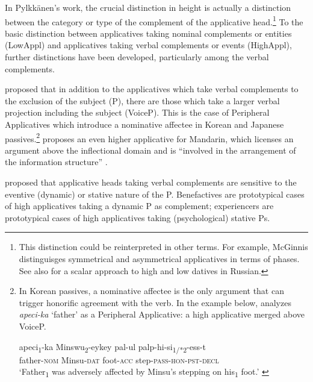 \documentclass[output=paper,colorlinks,citecolor=brown,modfonts,nonflat]{langsci/langscibook}
\begin{document}
In Pylkkänen’s work, the crucial distinction in height is actually a distinction between the category or type of the complement of the applicative head.\footnote{This distinction could be reinterpreted in other terms. For example, McGinnis distinguisges symmetrical and asymmetrical applicatives in terms of phases. See also \citet{BonehNash2017} for a scalar approach to high and low datives in Russian.} To the basic distinction between applicatives taking nominal complements or entities (LowAppl) and applicatives taking verbal complements or events (HighAppl), further distinctions have been developed, particularly among the verbal complements.

\citet{Kim2011high} proposed that in addition to the applicatives which take verbal complements to the exclusion of the subject ({\liv}P), there are those which take a larger verbal projection including the subject (VoiceP). This is the case of Peripheral Applicatives which introduce a nominative affectee in Korean and Japanese passives.\footnote{In Korean passives, a nominative affectee is the only argument that can trigger honorific agreement with the verb. In the example below, \citet{Kim2012affectees} analyzes \textit{apeci-ka} ‘father’ as a Peripheral Applicative: a high applicative merged above VoiceP.

\ea%
    \gll apeci\textsubscript{1}-ka Minswu\textsubscript{2}-eykey pal-ul palp-hi-si\textsubscript{1/*2}-ess-t\\
    father\textsc{-nom}  Minsu\textsc{-dat} foot\textsc{-acc}   step\textsc{-pass-hon-pst-decl}\\
    \glt ‘Father\textsubscript{1} was adversely affected by Minsu’s stepping on his\textsubscript{1} foot.’  \citep{Kim2012affectees}
    \z
} \citet{Tsai2018} proposes an even higher applicative for Mandarin, which licenses an argument above the inflectional domain and is “involved in the arrangement of the information structure” \citep[18]{Tsai2018}.


\citet{Cuervo2003, Cuervo2011, Cuervo2015Chapter} proposed that applicative heads taking verbal complements are sensitive to the eventive (dynamic) or stative nature of the {\liv}P. Benefactives are prototypical cases of high applicatives taking a dynamic {\liv}P as complement; experiencers are prototypical cases of high applicatives taking (psychological) stative {\liv}Ps.
\end{document}
